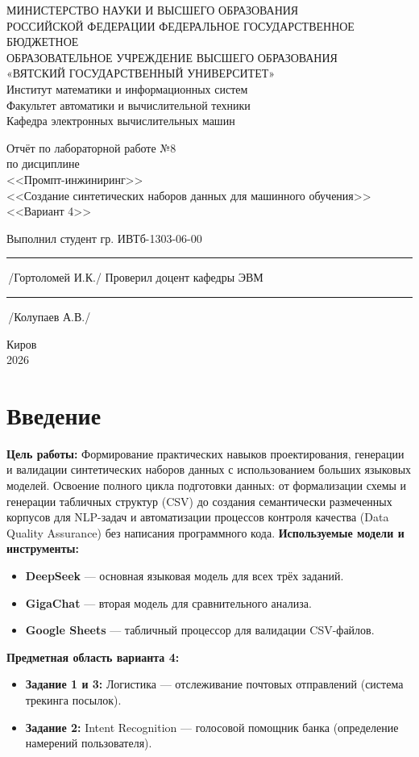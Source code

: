 \documentclass[oneside,a4paper,14pt]{extarticle} %
\begin{document}
\newpage
\thispagestyle{empty}
\begin{center}
МИНИСТЕРСТВО НАУКИ И ВЫСШЕГО ОБРАЗОВАНИЯ\\
РОССИЙСКОЙ ФЕДЕРАЦИИ
ФЕДЕРАЛЬНОЕ ГОСУДАРСТВЕННОЕ БЮДЖЕТНОЕ\\
ОБРАЗОВАТЕЛЬНОЕ
УЧРЕЖДЕНИЕ ВЫСШЕГО ОБРАЗОВАНИЯ\\
«ВЯТСКИЙ ГОСУДАРСТВЕННЫЙ УНИВЕРСИТЕТ»\\
Институт математики и информационных систем\\
Факультет автоматики и вычислительной техники\\
Кафедра электронных вычислительных машин
\end{center}
\vspace{20mm}
\begin{center}
Отчёт по лабораторной работе №8\\
по дисциплине\\
<<Промпт-инжиниринг>>\\
<<Создание синтетических наборов данных для машинного обучения>>\\
<<Вариант 4>>\\
\end{center}
\vspace{48mm}
\noindent
Выполнил студент гр. ИВТб-1303-06-00 \hfill \rule[-0,5mm]{30mm}{0.15mm}\,/Гортоломей И.К./
\newline
Проверил доцент кафедры ЭВМ \hfill \rule[-0,5mm]{30mm}{0.15mm}\,/Колупаев А.В./
\vfill
\begin{center}
Киров\\
2026
\end{center}
\newpage
\thispagestyle{empty}
\section*{Введение}
\noindent
\textbf{Цель работы:} Формирование практических навыков проектирования, генерации и валидации синтетических наборов данных с использованием больших языковых моделей. Освоение полного цикла подготовки данных: от формализации схемы и генерации табличных структур (CSV) до создания семантически размеченных корпусов для NLP-задач и автоматизации процессов контроля качества (Data Quality Assurance) без написания программного кода.
\noindent
\textbf{Используемые модели и инструменты:}
\begin{itemize}
\item \textbf{DeepSeek} --- основная языковая модель для всех трёх заданий.
\item \textbf{GigaChat} --- вторая модель для сравнительного анализа.
\item \textbf{Google Sheets} --- табличный процессор для валидации CSV-файлов.
\end{itemize}
\noindent
\textbf{Предметная область варианта 4:}
\begin{itemize}
\item \textbf{Задание 1 и 3:} Логистика --- отслеживание почтовых отправлений (система трекинга посылок).
\item \textbf{Задание 2:} Intent Recognition --- голосовой помощник банка (определение намерений пользователя).
\end{itemize}
\newpage
\end{document}
